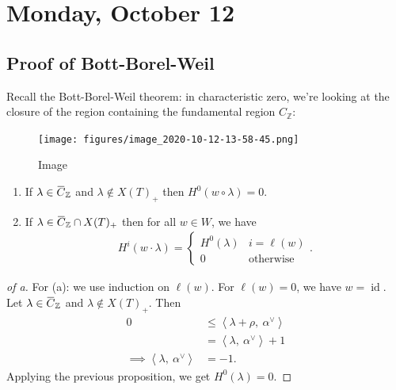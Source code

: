 \hypertarget{monday-october-12}{%
\section{Monday, October 12}\label{monday-october-12}}

\hypertarget{proof-of-bott-borel-weil}{%
\subsection{Proof of Bott-Borel-Weil}\label{proof-of-bott-borel-weil}}

Recall the Bott-Borel-Weil theorem: in characteristic zero, we're
looking at the closure of the region containing the fundamental region
\(C_{\mathbb{Z}}\):

\begin{figure}
\centering
\texttt{[image: figures/image\_2020-10-12-13-58-45.png]}
\caption{Image}
\end{figure}

\begin{theorem}

\begin{enumerate}
\def\labelenumi{\alph{enumi}.}
\item
  If
  \(\lambda \in \mkern 1.5mu\overline{\mkern-1.5muC\mkern-1.5mu}\mkern 1.5mu_{\mathbb{Z}}\)
  and \(\lambda \not\in X(T)_+\) then \(H^0(w\circ \lambda) = 0\).
\item
  If
  \(\lambda\in \mkern 1.5mu\overline{\mkern-1.5muC\mkern-1.5mu}\mkern 1.5mu_{\mathbb{Z}}\cap X(T)_+\)
  then for all \(w\in W\), we have
  \begin{align*}  
  H^i(w\cdot \lambda) = 
  \begin{cases}
  H^0(\lambda)& i = \ell(w) \\
  0 & \text{otherwise}
  \end{cases}
  .\end{align*}
\end{enumerate}

\end{theorem}

\begin{proof}[of a]

For (a): we use induction on \(\ell(w)\). For \(\ell(w) = 0\), we have
\(w = \operatorname{id}\). Let
\(\lambda \in \mkern 1.5mu\overline{\mkern-1.5muC\mkern-1.5mu}\mkern 1.5mu_{\mathbb{Z}}\)
and \(\lambda\not\in X(T)_+\). Then
\begin{align*}  
0 
&\leq {\left\langle {\lambda + \rho},~{\alpha^\vee} \right\rangle} \\
&= {\left\langle {\lambda},~{\alpha^\vee} \right\rangle} + 1 \\
\implies {\left\langle {\lambda},~{\alpha^\vee} \right\rangle} &= -1
.\end{align*}
Applying the previous proposition, we get \(H^0(\lambda) = 0\).

\end{proof}

